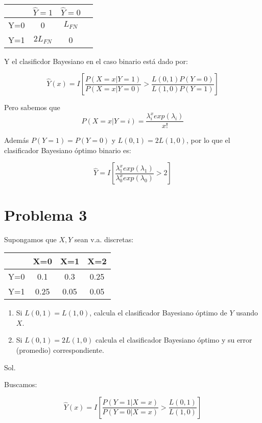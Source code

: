 \documentclass[letter, 11pt, twoside]{report}
\begin{document}
\begin{tabular}{c|ccc}
    & $\hat{Y}=1$ & $\hat{Y}=0 $  \\ \hline
   Y=0 & 0 & $L_{FN}$ \\
   Y=1  & $2L_{FN}$ & 0 \\
\end{tabular}

Y el clasificdor Bayesiano en el caso binario está dado por: 

\begin{equation}
    \hat{Y}(x)=I\left[\frac{P(X=x|Y=1)}{P(X=x|Y=0)}>\frac{L(0,1)P(Y=0)}{L(1,0)P(Y=1)}\right]
\end{equation}
 

Pero sabemos que $$P(X=x|Y=i)=\frac{\lambda_{i}^x exp(\lambda_i)}{x!}$$

Además $P(Y=1)=P(Y=0)$ y $L(0,1)=2L(1,0)$, por lo que el clasificador Bayesiano óptimo binario es: 


\begin{equation}
    \hat{Y}=I\left[\frac{\lambda_{1}^x exp(\lambda_1)}{\lambda_{0}^x exp(\lambda_0)}>2\right]
\end{equation}


{\color{mirosa}\section*{Problema 3}}

Supongamos que $X,Y$ sean v.a. discretas:

\begin{tabular}{c|ccc}
 & X=0 & X=1 & X=2  \\ \hline
Y=0 & 0.1 & 0.3 & 0.25\\
Y=1  & 0.25 & 0.05 & 0.05\\
\end{tabular}

\begin{enumerate}
    \item Si $L(0,1)=L(1,0)$, calcula el clasificador Bayesiano \'optimo de $Y$ usando $X$.
    \item Si $L(0,1)=2L(1,0)$ calcula el clasificador Bayesiano \'optimo y su error (promedio) correspondiente.
\end{enumerate} 

{\color{mirosa}Sol.}

Buscamos:

\begin{equation}
    \hat{Y}(x)=I\left[\frac{P(Y=1|X=x)}{P(Y=0|X=x)}>\frac{L(0,1)}{L(1,0)}\right]
\end{equation}
\end{document}
